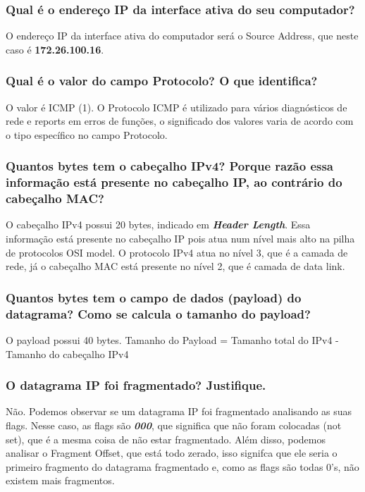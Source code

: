 \documentclass{article}
\begin{document}
\subsubsection{Qual é o endereço IP da interface ativa do seu computador?}

O endereço IP da interface ativa do computador será o Source Address, que neste caso é \textbf{172.26.100.16}.

\subsubsection{Qual é o valor do campo Protocolo? O que identifica?}

O valor é ICMP (1). O Protocolo ICMP é utilizado para vários diagnósticos de rede e reports em erros de funções, o significado dos valores varia de acordo com o tipo específico no campo Protocolo.

\subsubsection{Quantos bytes tem o cabeçalho IPv4? Porque razão essa informação está
presente no cabeçalho IP, ao contrário do cabeçalho MAC?}

O cabeçalho IPv4 possui 20 bytes, indicado em \textit{\textbf{Header Length}}. Essa informação está presente no cabeçalho IP pois atua num nível mais alto na pilha de protocolos OSI model. O protocolo IPv4 atua no nível 3, que é a camada de rede, já o cabeçalho MAC está presente no nível 2, que é camada de data link.

\subsubsection{Quantos bytes tem o campo de dados (payload) do datagrama? Como se
calcula o tamanho do payload?}

O payload possui 40 bytes. Tamanho do Payload = Tamanho total do IPv4 - Tamanho do cabeçalho IPv4 

\subsubsection{O datagrama IP foi fragmentado? Justifique.}

Não. Podemos observar se um datagrama IP foi fragmentado analisando as suas flags. Nesse caso, as flags são \textit{\textbf{000}}, que significa que não foram colocadas (not set), que é a mesma coisa de não estar fragmentado. Além disso, podemos analisar o Fragment Offset, que está todo zerado, isso signifca que ele seria o primeiro fragmento do datagrama fragmentado e, como as flags são todas 0's, não existem mais fragmentos.
\end{document}
